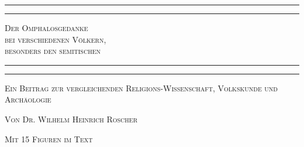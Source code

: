 \documentclass[a4paper, 11pt, oneside]{article}
\begin{document}
\renewcommand{\thefigure}{\frakfamily{\arabic{figure}}}
\renewcommand\thefootnote{\frakfamily{\arabic{footnote}}}
\let\oldfootnote\footnote
    \renewcommand{\footnote}[1]{\oldfootnote{\frakfamily\large#1}}
\begin{titlepage} %
	\centering %

	
	\rule{\textwidth}{1.6pt}\vspace*{-\baselineskip}\vspace*{2pt} %
	\rule{\textwidth}{0.4pt} %
	
	\vspace{1\baselineskip} %
	
	{\scshape\Huge Der Omphalosgedanke \\bei verschiedenen Völkern, \\besonders den semitischen}
	
	\vspace{1\baselineskip} %

	\rule{\textwidth}{0.4pt}\vspace*{-\baselineskip}\vspace{3.2pt} %
	\rule{\textwidth}{1.6pt} %
	
	\vspace{1\baselineskip} %
	
	
        {\scshape Ein Beitrag zur vergleichenden Religions-Wissenschaft, Volkskunde und Archäologie} %
	
	\vspace*{1\baselineskip} %

        {\scshape Von \Large Dr. Wilhelm Heinrich Roscher}

	\vspace*{1\baselineskip} %

        {\scshape\small Mit 15 Figuren im Text}

	\vspace{1\baselineskip}



\end{titlepage}
\end{document}
